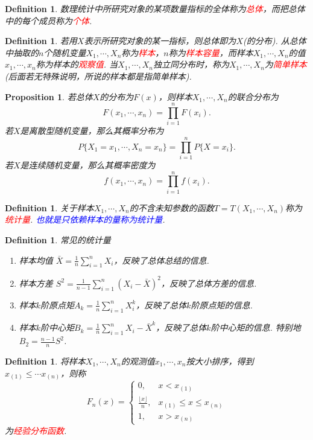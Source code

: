 \documentclass{article}
\newtheorem{proposition}[theorem]{Proposition}
\newtheorem{definition}[theorem]{Definition}
\newcommand{\redt}[1]{\textcolor{red}{#1}}
\newcommand{\bluet}[1]{\textcolor{blue}{#1}}
\begin{document}
\begin{definition}
\rm 数理统计中所研究对象的某项数量指标的全体称为\redt{总体}，而把总体中的每个成员称为\redt{个体}.
\end{definition}

\begin{definition}
\rm 若用$X$表示所研究对象的某一指标，则总体即为$X$(的分布). 从总体中抽取的$n$个随机变量$X_1,\cdots,X_n$称为\redt{样本}，$n$称为\redt{样本容量}，而样本$X_1,\cdots,X_n$的值$x_1,\cdots,x_n$称为样本的\redt{观察值}. 当$X_1,\cdots,X_n$独立同分布时，称为$X_1,\cdots,X_n$为\redt{简单样本}(后面若无特殊说明，所说的样本都是指简单样本).
\end{definition}

\begin{proposition}
\rm 若总体$X$的分布为$F(x)$，则样本$X_1,\cdots,X_n$的联合分布为
$$
F(x_1,\cdots,x_n) = \prod\limits_{i=1}^n F(x_i).
$$
若$X$是离散型随机变量，那么其概率分布为
$$
P\{X_1 = x_1 ,\cdots , X_n = x_n\} = \prod\limits_{i=1}^n P\{X=x_i\}.
$$
若$X$是连续随机变量，那么其概率密度为
$$
f(x_1,\cdots,x_n) = \prod\limits_{i=1}^n f(x_i).
$$
\end{proposition}

\begin{definition}
\rm 关于样本$X_1,\cdots,X_n$的不含未知参数的函数$T=T(X_1,\cdots,X_n)$称为\redt{统计量}. \bluet{也就是只依赖样本的量称为统计量}.
\end{definition}

\begin{definition}
\rm 常见的统计量
\begin{enumerate}
	\item 样本均值 $\bar{X} = \frac{1}{n}\sum\limits_{i=1}^n X_i$，反映了总体总结的信息. 
	\item 样本方差 $S^2 = \frac{1}{n-1}\sum\limits_{i=1}^n(X_i-\bar{X})^2$，反映了总体方差的信息.
	\item 样本$k$阶原点矩$A_k = \frac{1}{n}\sum\limits_{i=1}^n X_i^k$，反映了总体$k$阶原点矩的信息.
	\item 样本$k$阶中心矩$B_k = \frac{1}{n}\sum\limits_{i=1}^n {X_i-\bar{X}}^k$，反映了总体$k$阶中心矩的信息. 特别地$B_2 = \frac{n-1}{n}S^2$.
\end{enumerate}
\end{definition}

\begin{definition}
\rm 将样本$X_1,\cdots,X_n$的观测值$x_1,\cdots,x_n$按大小排序，得到$x_{(1)} \leq \cdots x_{(n)}$，则称
$$
F_n(x) = \left\{
\begin{array}{ll}
0, & x <x_{(1)} \\
\frac{\lfloor x \rfloor}{n}, &  x_{(1)}\leq x \leq x_{(n)}\\
1, &x > x_{(n)}
\end{array} \right.
$$
为\redt{经验分布函数}.
\end{definition}
\end{document}
